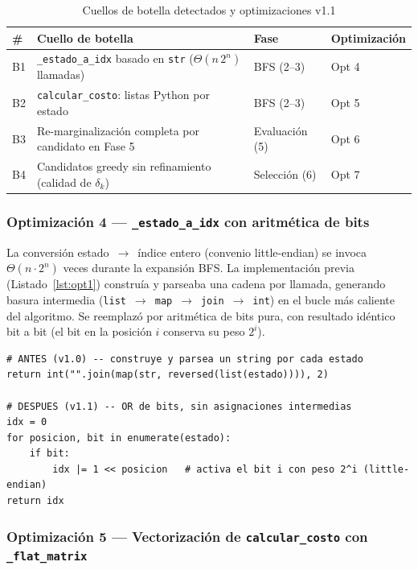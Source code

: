 \documentclass[12pt,letterpaper]{article}
\theoremstyle{definition}
\theoremstyle{remark}
\newcommand{\BigTheta}[1]{\Theta(#1)}
\begin{document}
\begin{table}[ht]
\centering
\caption{Cuellos de botella detectados y optimizaciones v1.1}
\label{tab:bottlenecks}
\begin{tabular}{@{}l p{4.6cm} l l@{}}
\toprule
\textbf{\#} & \textbf{Cuello de botella} & \textbf{Fase} & \textbf{Optimización} \\
\midrule
B1 & \texttt{\_estado\_a\_idx} basado en \texttt{str} ($\Theta(n\,2^n)$ llamadas) &
  BFS (2--3) & Opt 4 \\
B2 & \texttt{calcular\_costo}: listas Python por estado &
  BFS (2--3) & Opt 5 \\
B3 & Re-marginalización completa por candidato en Fase 5 &
  Evaluación (5) & Opt 6 \\
B4 & Candidatos greedy sin refinamiento (calidad de $\delta_k$) &
  Selección (6) & Opt 7 \\
\bottomrule
\end{tabular}
\end{table}

\subsubsection{Optimización 4 --- \texttt{\_estado\_a\_idx} con aritmética de bits}

La conversión estado~$\to$~índice entero (convenio little-endian) se invoca
$\BigTheta{n \cdot 2^n}$ veces durante la expansión BFS. La implementación previa
(Listado~\ref{lst:opt1}) construía y parseaba una cadena por llamada, generando
basura intermedia (\texttt{list}~$\to$~\texttt{map}~$\to$~\texttt{join}~$\to$~\texttt{int})
en el bucle más caliente del algoritmo. Se reemplazó por aritmética de bits pura,
con resultado idéntico bit a bit (el bit en la posición $i$ conserva su peso $2^i$).

\begin{lstlisting}[style=python,
  caption={Opt 4: estado a indice sin construir strings},label=lst:opt4]
# ANTES (v1.0) -- construye y parsea un string por cada estado
return int("".join(map(str, reversed(list(estado)))), 2)

# DESPUES (v1.1) -- OR de bits, sin asignaciones intermedias
idx = 0
for posicion, bit in enumerate(estado):
    if bit:
        idx |= 1 << posicion   # activa el bit i con peso 2^i (little-endian)
return idx
\end{lstlisting}

\subsubsection{Optimización 5 --- Vectorización de \texttt{calcular\_costo} con \texttt{\_flat\_matrix}}
\end{document}
